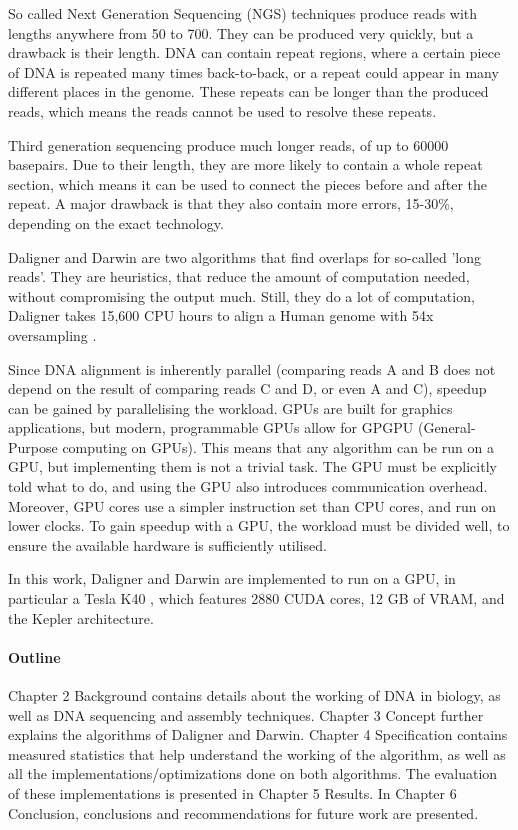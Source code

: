 \documentclass[../main/thesis.tex]{subfiles}
\begin{document}
So called Next Generation Sequencing (NGS) techniques produce reads with lengths anywhere from 50 to 700.
They can be produced very quickly, but a drawback is their length.
DNA can contain repeat regions, where a certain piece of DNA is repeated many times back-to-back, or a repeat could appear in many different places in the genome.
These repeats can be longer than the produced reads, which means the reads cannot be used to resolve these repeats.

Third generation sequencing produce much longer reads, of up to 60000 basepairs.
Due to their length, they are more likely to contain a whole repeat section, which means it can be used to connect the pieces before and after the repeat.
A major drawback is that they also contain more errors, 15-30\%, depending on the exact technology.

Daligner and Darwin are two algorithms that find overlaps for so-called 'long reads'.
They are heuristics, that reduce the amount of computation needed, without compromising the output much.
Still, they do a lot of computation, Daligner takes 15,600 CPU hours to align a Human genome with 54x oversampling \cite{Daligner}.

Since DNA alignment is inherently parallel (comparing reads A and B does not depend on the result of comparing reads C and D, or even A and C), speedup can be gained by parallelising the workload.
GPUs are built for graphics applications, but modern, programmable GPUs allow for GPGPU (General-Purpose computing on GPUs).
This means that any algorithm can be run on a GPU, but implementing them is not a trivial task.
The GPU must be explicitly told what to do, and using the GPU also introduces communication overhead.
Moreover, GPU cores use a simpler instruction set than CPU cores, and run on lower clocks.
To gain speedup with a GPU, the workload must be divided well, to ensure the available hardware is sufficiently utilised.

In this work, Daligner and Darwin are implemented to run on a GPU, in particular a Tesla K40 \cite{K40}, which features 2880 CUDA cores, 12 GB of VRAM, and the Kepler architecture.


\paragraph{Outline}
Chapter 2 Background contains details about the working of DNA in biology, as well as DNA sequencing and assembly techniques.
Chapter 3 Concept further explains the algorithms of Daligner and Darwin.
Chapter 4 Specification contains measured statistics that help understand the working of the algorithm, as well as all the implementations/optimizations done on both algorithms.
The evaluation of these implementations is presented in Chapter 5 Results.
In Chapter 6 Conclusion, conclusions and recommendations for future work are presented.
\end{document}

